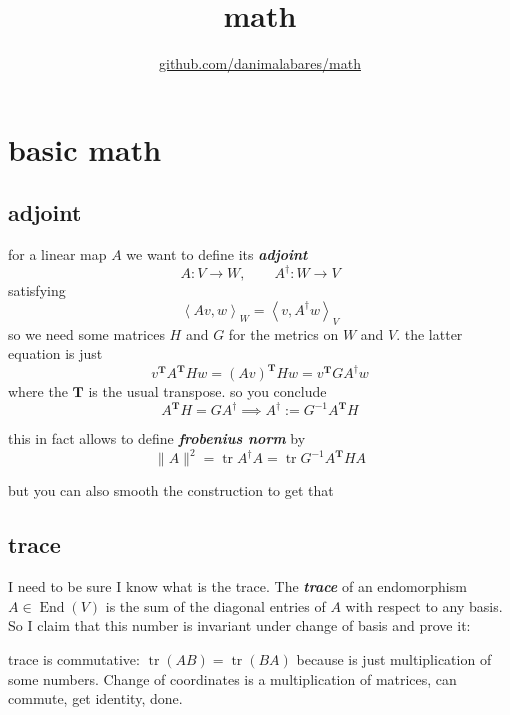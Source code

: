 
\usepackage{textgreek}
\title{math}
\author{\href{https://github.com/danimalabares/math}{github.com/danimalabares/math}}




\maketitle
{}
\tableofcontents
\clearpage
\chapter{basic math}

\section{adjoint}

for a linear map \(A\) we want to define its \textit{\textbf{adjoint}}
\[A:V \to W, \qquad A^{\dag}:W \to V\]
satisfying
\[\left<Av,w\right>_W=\left<v,A^\dag w\right>_V\]
so we need some matrices \(H\) and \(G\) for the metrics on \(W\) and \(V\). the latter equation is just
\[v^{\mathbf{T}}A^{\mathbf{T}}Hw=(Av)^{\mathbf{T}}Hw=v^{\mathbf{T}}GA^\dag w\]
where the \(\mathbf{T}\) is the usual transpose. so you conclude
\[A^{\mathbf{T}}H=GA^\dag \implies A^\dag:=G^{-1}A^{\mathbf{T}}H\]

this in fact allows to define \textit{\textbf{frobenius norm}} by
\[\|A\|^2=\operatorname{tr}A^\dag A=\operatorname{tr}G^{-1}A^{\mathbf{T}}HA\]

but you can also smooth the construction to get that 

\section{trace}

I need to be sure I know what is the trace. The \textit{\textbf{trace}} of an endomorphism \(A \in \operatorname{End}(V)\) is the sum of the diagonal entries of \(A\) with respect to any basis. So I claim that this number is invariant under change of basis and prove it:

trace is commutative: \(\operatorname{tr}(AB)=\operatorname{tr}(BA)\) because is just multiplication of some numbers. Change of coordinates is a multiplication of matrices, can commute, get identity, done.

